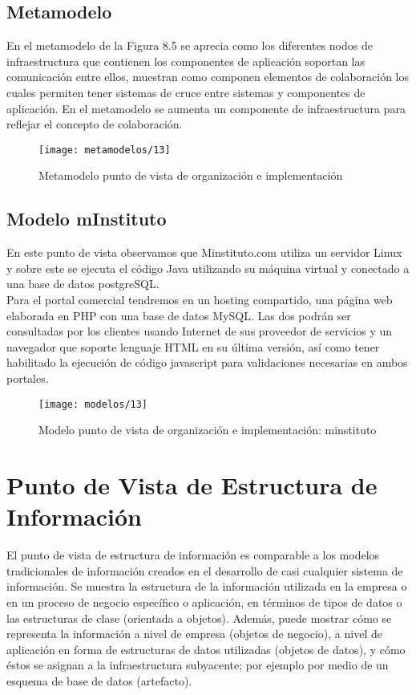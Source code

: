   \subsection{Metamodelo}
  En el metamodelo de la Figura 8.5 se aprecia como los diferentes nodos de infraestructura que contienen los componentes de aplicación soportan las comunicación entre ellos, muestran como componen elementos de colaboración los cuales permiten tener sistemas de cruce entre sistemas y componentes de aplicación. En el metamodelo se aumenta un componente de infraestructura para reflejar el concepto de colaboración.
  
  \begin{figure}[H]
  	\centering
  	\texttt{[image: metamodelos/13]}
  	\captionsetup{width=.95\textwidth}
  	\caption{Metamodelo punto de vista de organización e implementación}
  	\label{metamodelo13}
  \end{figure}
  
  \subsection{Modelo mInstituto}
  En este punto de vista observamos que Minstituto.com utiliza un servidor Linux y sobre este se ejecuta el código Java utilizando su máquina virtual y conectado a una base de datos postgreSQL. \\
  
  Para el portal comercial tendremos en un hosting compartido, una página web elaborada en PHP con una base de datos MySQL. Las dos podrán ser consultadas por los clientes usando Internet de sus proveedor de servicios y un navegador que soporte lenguaje HTML en su última versión, así como tener habilitado la ejecución de código javascript para validaciones necesarias en ambos portales.

  \begin{figure}[H]
  	\centering
  	\texttt{[image: modelos/13]}
  	\captionsetup{width=.95\textwidth}
  	\caption{Modelo punto de vista de organización e implementación: minstituto}
  	\label{modelo13}
  \end{figure}

\section{Punto de Vista de Estructura de Información}
El punto de vista de estructura de información es comparable a los modelos tradicionales de información creados en el desarrollo de casi cualquier sistema de información. Se muestra la estructura de la información utilizada en la empresa o en un proceso de negocio específico o aplicación, en términos de tipos de datos o las estructuras de clase (orientada a objetos). Además, puede mostrar cómo se representa la información a nivel
de empresa (objetos de negocio), a nivel de aplicación en forma de estructuras de datos utilizadas (objetos de datos), y cómo éstos se asignan a la infraestructura subyacente; por ejemplo por medio de un esquema de base de datos (artefacto).
    
